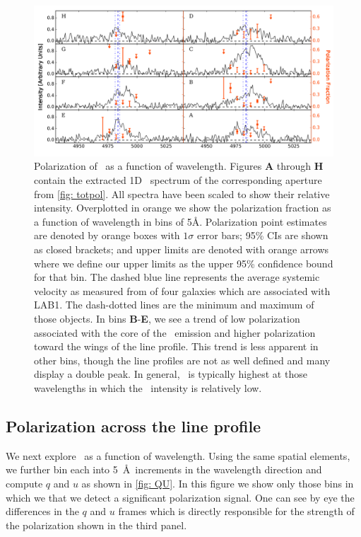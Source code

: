 \begin{figure}
\includegraphics[width=\linewidth]{Figures/lyapol/f4_v2.pdf}
\caption[Polarization as a function of wavelength for each spatial bin]{Polarization of \lya~as a function of wavelength. Figures \textbf{A} through \textbf{H} contain the extracted 1D \lya~spectrum of the corresponding aperture from \autoref{fig: totpol}. All spectra have been scaled to show their relative intensity. Overplotted in orange we show the polarization fraction as a function of wavelength in bins of 5\AA.  Polarization point estimates are denoted by orange boxes with $1 \sigma$ error bars;  95\% CIs are shown as closed brackets; and upper limits are denoted with orange arrows where we define our upper limits as the upper 95\% confidence bound for that bin. The dashed blue line represents the average systemic velocity as measured from \oiii of four galaxies which are associated with LAB1. The dash-dotted lines are the minimum and maximum of those objects. In bins \textbf{B}-\textbf{E},  we see a trend of low polarization associated with the core of the \lya~emission and higher polarization toward the wings of the line profile. This trend is less apparent in other bins, though the line profiles are not as well defined and many display a double peak. In general, \pol~is typically highest at those wavelengths in which the \lya~intensity is relatively low.}
\label{fig: oned}
\end{figure}


\subsection{Polarization across the line profile}\label{sec: wavelength pol}
We next explore \pol~as a function of wavelength. Using the same spatial elements, we further bin each into 5~\AA~increments in the wavelength direction and compute $q$ and $u$ as shown in \autoref{fig: QU}. In this figure we show only those bins in which we that we detect a significant polarization signal. One can see by eye the differences in the $q$ and $u$ frames which is directly responsible for the strength of the polarization shown in the third panel. 

